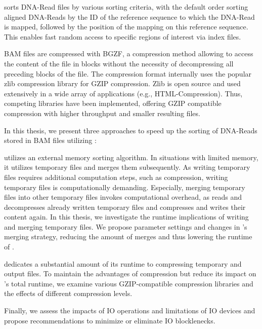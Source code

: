\sort sorts DNA-Read files by various sorting criteria, with the default order sorting aligned DNA-Reads by the ID of the reference sequence to which the DNA-Read is mapped, followed by the position of the mapping on this reference sequence. This enables fast random access to specific regions of interest via index files. 

BAM files are compressed with BGZF, a compression method allowing to access the content of the file in blocks without the necessity of decompressing all preceding blocks of the file. The compression format internally uses the popular zlib compression library for GZIP compression. Zlib is open source and used extensively in a wide array of applications (e.g., HTML-Compression). Thus, competing libraries have been implemented, offering GZIP compatible compression with higher throughput and smaller resulting files. 

In this thesis, we present three approaches to speed up the sorting of DNA-Reads stored in BAM files utilizing \sort: 

\sort utilizes an external memory sorting algorithm. In situations with limited memory, it utilizes temporary files and merges them subsequently. As writing temporary files requires additional computation steps, such as compression, writing temporary files is computationally demanding. Especially, merging temporary files into other temporary files invokes computational overhead, as \sort reads and decompresses already written temporary files and compresses and writes their content again. In this thesis, we investigate the runtime implications of \sort writing and merging temporary files. We propose parameter settings and changes in \sort's merging strategy, reducing the amount of merges and thus lowering the runtime of \sort. 

\sort dedicates a substantial amount of its runtime to compressing temporary and output files. To maintain the advantages of compression but reduce its impact on \sort's total runtime, we examine various GZIP-compatible compression libraries and the effects of different compression levels.

Finally, we assess the impacts of IO operations and limitations of IO devices and propose recommendations to minimize or eliminate IO blocklenecks. 
